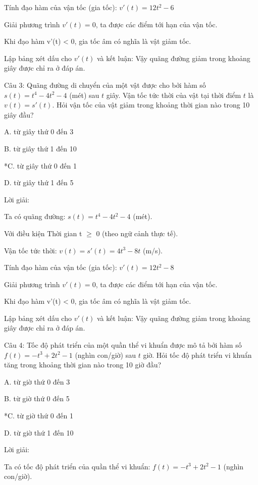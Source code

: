 \documentclass[a4paper,12pt]{article}
\begin{document}
Tính đạo hàm của vận tốc (gia tốc):
\(v'(t) = 12t^{2}- 6\)

Giải phương trình \(v'(t) = 0\), ta được các điểm tới hạn của vận tốc.



Khi đạo hàm v'(t) < 0, gia tốc âm có nghĩa là vật giảm tốc.

Lập bảng xét dấu cho \(v'(t)\) và kết luận: Vậy quãng đường giảm trong khoảng giây được chỉ ra ở đáp án.



Câu 3: Quãng đường di chuyển của một vật được cho bởi hàm số \(s(t) = t^{4}- 4t^{2}- 4\) (mét) sau \(t\) giây. 
            Vận tốc tức thời của vật tại thời điểm \(t\) là \(v(t) = s'(t)\). 
            Hỏi vận tốc của vật giảm trong khoảng thời gian nào trong 10 giây đầu?

A. từ giây thứ 0 đến 3

B. từ giây thứ 1 đến 10

*C. từ giây thứ 0 đến 1

D. từ giây thứ 1 đến 5

Lời giải:

Ta có quãng đường: \(s(t) = t^{4}- 4t^{2}- 4\) (mét).


Với điều kiện Thời gian t $\geq$ 0 (theo ngữ cảnh thực tế).

Vận tốc tức thời: \(v(t) = s'(t) = 4t^{3}- 8t\) (m/s).

Tính đạo hàm của vận tốc (gia tốc):
\(v'(t) = 12t^{2}- 8\)

Giải phương trình \(v'(t) = 0\), ta được các điểm tới hạn của vận tốc.



Khi đạo hàm v'(t) < 0, gia tốc âm có nghĩa là vật giảm tốc.

Lập bảng xét dấu cho \(v'(t)\) và kết luận: Vậy quãng đường giảm trong khoảng giây được chỉ ra ở đáp án.



Câu 4: Tốc độ phát triển của một quần thể vi khuẩn được mô tả bởi hàm số \(f(t) = -t^{3}+ 2t^{2}- 1\) (nghìn con/giờ) sau \(t\) giờ. 
            Hỏi tốc độ phát triển vi khuẩn tăng trong khoảng thời gian nào trong 10 giờ đầu?

A. từ giờ thứ 0 đến 3

B. từ giờ thứ 0 đến 5

*C. từ giờ thứ 0 đến 1

D. từ giờ thứ 1 đến 10

Lời giải:

Ta có tốc độ phát triển của quần thể vi khuẩn: \(f(t) = -t^{3}+ 2t^{2}- 1\) (nghìn con/giờ).
\end{document}
